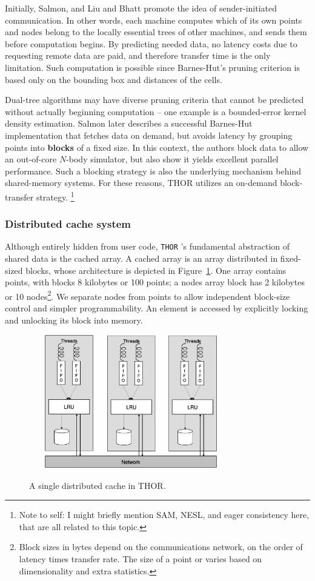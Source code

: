 \documentclass[twoside,leqno,twocolumn]{article}
\newcommand{\THOR}{{{\tt THOR}} }
\newcommand{\authornote}[1]{\footnote{Note to self: #1}}
\newcommand{\authorsnote}[1]{\authornote{#1}}
\newcommand{\fig}[1]{Figure~\ref{fig:#1}}
\newcommand{\mysubsub}[1]{\subsubsection{#1} }
\newcommand{\defterm}[1]{{\bf #1}}
\begin{document}
Initially, Salmon\cite{salmon_thesis}, and Liu and Bhatt\cite{liu94experiences} promote the idea of sender-initiated communication.
In other words, each machine computes which of its own points and nodes belong to the locally essential trees of other machines, and sends them before computation begins.
By predicting needed data, no latency costs due to requesting remote data are paid, and therefore transfer time is the only limitation.
Such computation is possible since Barnes-Hut's pruning criterion is based only on the bounding box and distances of the cells.

Dual-tree algorithms may have diverse pruning criteria that cannot be predicted without actually beginning computation -- one example is a bounded-error kernel density estimation\cite{gray_kde}.
Salmon later describes\cite{salmon97parallel} a successful Barnes-Hut implementation that fetches data on demand, but avoids latency by grouping points into \defterm{blocks} of a fixed size.
In this context, the authors block data to allow an out-of-core $N$-body simulator, but also show it yields excellent parallel performance.
Such a blocking strategy is also the underlying mechanism behind shared-memory systems.
For these reasons, THOR utilizes an on-demand block-transfer strategy.
\authorsnote{I might briefly mention SAM, NESL, and eager consistency here, that are all related to this topic.}

\mysubsub{Distributed cache system}
Although entirely hidden from user code, \THOR's fundamental abstraction of shared data is the cached array.
A cached array is an array distributed in fixed-sized blocks, whose architecture is depicted in \fig{cache}.
One array contains points, with blocks 8 kilobytes or 100 points; a nodes array block has 2 kilobytes or 10 nodes\footnote{Block sizes in bytes depend on the communications network, on the order of latency times transfer rate.  The size of a point or varies based on dimensionality and extra statistics.}.
We separate nodes from points to allow independent block-size control and simpler programmability.
An element is accessed by explicitly locking and unlocking its block into memory.

\begin{figure}
  \hspace{-.17in}
  \includegraphics[width=3.5in,height=2.3in]{DistributedArchitecture.eps}
  \vspace{-.3in}
  \
  \caption{\label{fig:cache} A single distributed cache in THOR.}
\end{figure}
\end{document}
